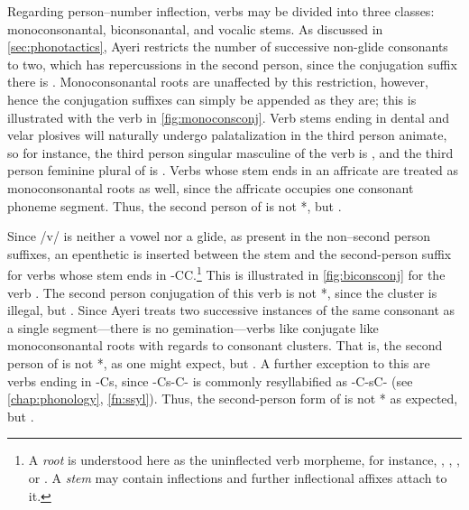 Regarding person--number inflection, verbs may be divided into three classes: 
monoconsonantal, biconsonantal, and vocalic stems. As discussed in 
\autoref{sec:phonotactics}, Ayeri restricts the number of successive non-glide 
consonants to two, which has repercussions in the second person, since the 
conjugation suffix there is . Monoconsonantal roots are 
unaffected by this restriction, however, hence the conjugation suffixes can 
simply be appended as they are; this is illustrated with the verb 
 in \autoref{fig:monoconsconj}. Verb stems 
ending in dental and velar plosives will naturally undergo palatalization in 
the third person animate, so for instance, the third person singular masculine 
of the verb  is , and the third person feminine plural of  is . Verbs whose 
stem ends in an affricate are treated as monoconsonantal roots as well, since 
the affricate occupies one consonant phoneme segment. Thus, the second 
person of  is not *, but 
.

Since /v/ is neither a vowel nor a glide, as present in the non–second 
person suffixes, an epenthetic  is inserted between the stem and 
the second-person suffix for verbs whose stem ends in -CC.\footnote{A 
\emph{root} is understood here as the uninflected verb morpheme, for 
instance, , , , or
. A \emph{stem} may contain inflections and further 
inflectional affixes attach to it.} This is illustrated in 
\autoref{fig:biconsconj} for the verb . The 
second person conjugation of this verb is not *, since 
the cluster  is illegal, but . Since Ayeri 
treats two successive instances of the same consonant as a single 
segment---there is no gemination---verbs like  
conjugate like monoconsonantal roots with regards to consonant clusters. That 
is, the second person of  is not *, 
as one might expect, but . A further exception to this 
are verbs ending in -Cs, since -Cs-C- is commonly resyllabified as -C-sC- (see 
\autoref{chap:phonology}, \autoref{fn:ssyl}). Thus, the second-person 
form of  is not * as 
expected, but .

